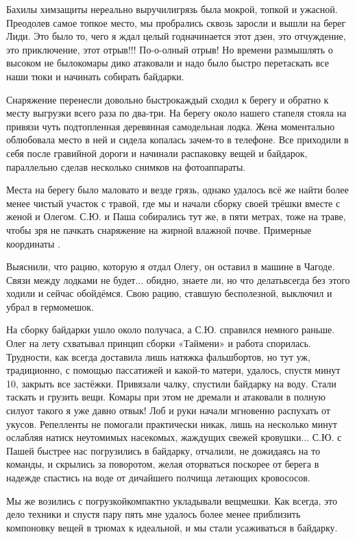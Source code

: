 Бахилы химзащиты нереально выручили\mdash грязь была мокрой, топкой и ужасной. Преодолев самое топкое место, мы пробрались сквозь заросли и вышли на берег Лиди. Это было то, чего я ждал целый год\mdash начинается этот дзен, это отчуждение, это приключение, этот отрыв!!! По-о-олный отрыв! Но времени размышлять о высоком не было\mdash комары дико атаковали и надо было быстро перетаскать все наши тюки и начинать собирать байдарки. 

Снаряжение перенесли довольно быстро\mdash каждый сходил к берегу и обратно к месту выгрузки всего раза по два-три. На берегу около нашего стапеля стояла на привязи чуть подтопленная деревянная самодельная лодка. Жена моментально облюбовала место в ней и сидела копалась зачем-то в телефоне. Все приходили в себя после гравийной дороги и начинали распаковку вещей и байдарок, параллельно сделав несколько снимков на фотоаппараты. 

Места на берегу было маловато и везде грязь, однако удалось всё же найти более менее чистый участок с травой, где мы и начали сборку своей трёшки вместе с женой и Олегом. С.Ю. и Паша собирались тут же, в пяти метрах, тоже на траве, чтобы зря не пачкать снаряжение на жирной влажной почве. Примерные координаты \CoordsLidSeventeenStapel.

Выяснили, что рацию, которую я отдал Олегу, он оставил в машине в Чагоде. Связи между лодками не будет$\ldots$ обидно, знаете ли, но что делать\mdash всегда без этого ходили и сейчас обойдёмся. Свою рацию, ставшую бесполезной, выключил и убрал в гермомешок.

На сборку байдарки ушло около получаса, а С.Ю. справился немного раньше. Олег на лету схватывал принцип сборки «Таймени» и работа спорилась. Трудности, как всегда доставила лишь натяжка фальшбортов, но тут уж, традиционно, с помощью пассатижей и какой-то матери, удалось, спустя минут 10, закрыть все застёжки. Привязали чалку, спустили байдарку на воду. Стали таскать и грузить вещи. Комары при этом не дремали и атаковали в полную силу\mdash от такого я уже давно отвык! Лоб и руки начали мгновенно распухать от укусов. Репелленты не помогали практически никак, лишь на несколько минут ослабляя натиск неутомимых насекомых, жаждущих свежей кровушки$\ldots$ С.Ю. с Пашей быстрее нас погрузились в байдарку, отчалили, не дожидаясь на то команды, и скрылись за поворотом, желая оторваться поскорее от берега в надежде спастись на воде от дичайшего полчища летающих кровососов.

Мы же возились с погрузкой\mdash компактно укладывали вещмешки. Как всегда, это дело техники и спустя пару пять мне удалось более менее приблизить компоновку вещей в трюмах к идеальной, и мы стали усаживаться в байдарку. 


